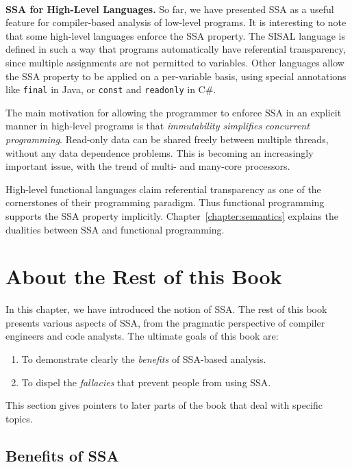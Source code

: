 ~\\ \textbf{SSA for High-Level Languages.} 
So far, we have presented SSA as a useful feature for compiler-based analysis of low-level programs. 
It is interesting to note that some high-level languages enforce the SSA property. 
The SISAL language is defined in such a way that programs automatically have referential transparency, since multiple assignments are not permitted to variables. 
Other languages allow the SSA property to be applied on a per-variable basis, using special annotations like \texttt{final} in Java, or \texttt{const} and \texttt{readonly} in C\#.

The main motivation for allowing the programmer to enforce SSA in an explicit manner in high-level programs is that \textit{immutability simplifies concurrent programming}. 
Read-only data can be shared freely between multiple threads, without any data dependence problems. 
This is becoming an increasingly important issue, with the trend of multi- and many-core processors.

High-level functional languages claim referential transparency as one of the cornerstones of their programming paradigm. 
Thus functional programming supports the SSA property implicitly. 
Chapter~\ref{chapter:semantics} explains the dualities between SSA and functional programming.



\section{About the Rest of this Book}

In this chapter, we have introduced the notion of SSA. 
The rest of this book presents various aspects of SSA, from the pragmatic perspective of compiler engineers and code analysts. 
The ultimate goals of this book are:
\begin{enumerate}
\item To demonstrate clearly the \emph{benefits} of SSA-based analysis.
\item To dispel the \emph{fallacies} that prevent people from using SSA.
\end{enumerate}
This section gives pointers to later parts of the book that deal with specific topics.


\subsection{Benefits of SSA}
\vspace{-1mm}

